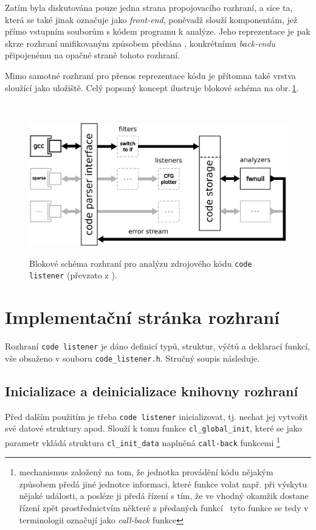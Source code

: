 Zatím byla diskutována pouze jedna strana propojovacího rozhraní, a sice
ta, která se také jinak označuje jako \emph{front-end}, poněvadž slouží
komponentám, jež přímo  vstupním souborům s kódem programu
k analýze. Jeho reprezentace je pak skrze rozhraní unifikovaným způsobem
předána , konkrétnímu \emph{back-endu} připojenému na opačné straně
tohoto rozhraní.

Mimo samotné rozhraní pro přenos reprezentace kódu je přítomna
také vrstva sloužící jako uložiště. Celý popsaný koncept ilustruje
blokové schéma na obr.\,\ref{fig:code-listener:api}.

\hspace*{\fill}\\[-\baselineskip]
\begin{figure}[!h]
    \begin{center}
        \includegraphics[width=1\textwidth,keepaspectratio]{fig/cl-block-diagram}
        \label{fig:code-listener:api}
        \caption{Blokové schéma rozhraní pro analýzu zdrojového kódu
                 \texttt{code listener} (převzato z \cite{web:FITVUTBR:VeriFIT:CodeListener}).}
    \end{center}
\end{figure}


\section{Implementační stránka rozhraní}

Rozhraní \texttt{code listener} je dáno definicí typů, struktur,
výčtů a deklarací funkcí, vše obsaženo v souboru \texttt{code\_listener.h}.
Stručný soupis následuje.

\subsection{Inicializace a deinicializace knihovny rozhraní}
Před dalším použitím je třeba \texttt{code listener} inicializovat,
tj. nechat jej vytvořit své datové struktury apod. Slouží
k tomu funkce \texttt{cl\_global\_init}, které se jako parametr
vkládá struktura \texttt{cl\_init\_data} naplněná \texttt{call-back}
funkcemi%
%
\footnote{mechanismus založený na tom, že jednotka provádění kódu
nějakým způsobem předá jiné jednotce informaci, které funkce
volat např. při výskytu nějaké události, a posléze ji předá řízení
s tím, že ve vhodný okamžik dostane řízení zpět prostřednictvím
některé z předaných funkcí \ndash\ tyto funkce 
se tedy v terminologii označují jako \emph{call-back} funkce}%
%

